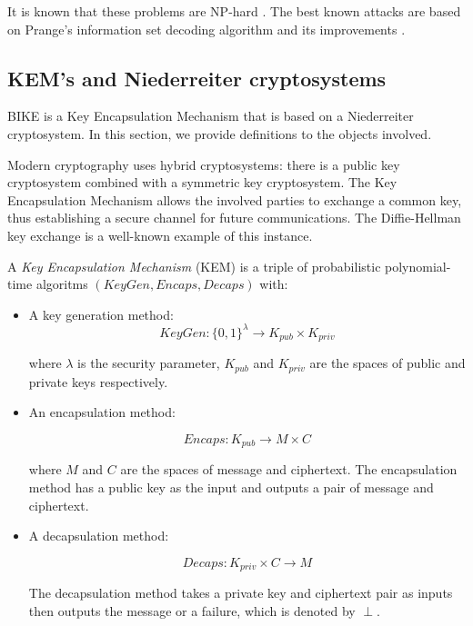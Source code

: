It is known that these problems are NP-hard \cite{nphard}. The best known attacks are based on Prange's information set decoding algorithm and its improvements \cite{prange,Stern:1988:ISD,MMT:2011:ISD,BJMM:2012:ISD}.

\subsection{KEM's and Niederreiter cryptosystems}

BIKE is a Key Encapsulation Mechanism that is based on a Niederreiter cryptosystem. In this section, we provide definitions to the objects involved.

Modern cryptography uses hybrid cryptosystems: there is a public key cryptosystem combined with a symmetric key cryptosystem. The Key Encapsulation Mechanism allows the involved parties to exchange a common key, thus establishing a secure channel for future communications. The Diffie-Hellman key exchange is a well-known example of this instance.

\begin{defn}
A \textit{Key Encapsulation Mechanism} (KEM) is a triple of probabilistic polynomial-time algoritms $(KeyGen, Encaps, Decaps)$ with:

\begin{itemize}
\item A key generation method:
\[
KeyGen: \{ 0,1 \}^\lambda \rightarrow K_{pub} \times K_{priv}
\]

where $\lambda$ is the security parameter, $K_{pub}$ and $K_{priv}$ are the spaces of public and private keys respectively.

\item An encapsulation method:

\[
Encaps: K_{pub} \rightarrow M \times C
\]

where $M$ and $C$ are the spaces of message and ciphertext. The encapsulation method has a public key as the input and outputs a pair of message and ciphertext.

\item A decapsulation method:

\[
Decaps: K_{priv} \times C \rightarrow M
\]

The decapsulation method takes a private key and ciphertext pair as inputs then outputs the message or a failure, which is denoted by $\perp$.
\end{itemize}
\end{defn}

